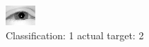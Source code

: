 \begin{figure}[h!]
\begin{center}
\includegraphics[width=0.60\columnwidth]{figures/ID2256_class_1_target_2.png}
\end{center}
\caption{ Classification: 1 actual target: 2}
\label{fig:ID2256_class_1_target_2}
\end{figure}
